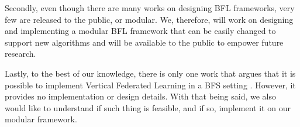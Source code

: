 Secondly, even though there are many works on designing BFL frameworks, very few are released to the public, or modular. We, therefore, will work on designing and implementing a modular BFL framework that can be easily changed to support new algorithms and will be available to the public to empower future research.

Lastly, to the best of our knowledge, there is only one work that argues that it is possible to implement Vertical Federated Learning in a BFS setting \cite{10.48550/arxiv.1912.04859}. However, it provides no implementation or design details. With that being said, we also would like to understand if such thing is feasible, and if so, implement it on our modular framework.




